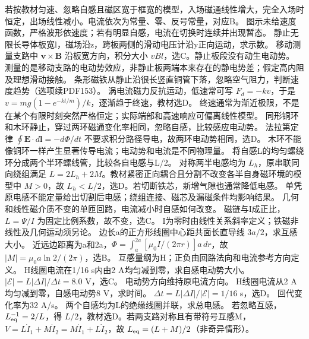 \workings 若按教材匀速、忽略自感且磁区宽于框宽的模型，入场磁通线性增大，完全入场时恒定，出场线性减小。电流依次为常量、零、反号常量，对应B。
\crosscheck 图示未给速度函数，严格波形依速度；若有明显自感，电流在切换时连续并出现暂态。
\problemtext 静止无限长导体板宽l，磁场沿z，跨板两侧的滑动电压计沿y正向运动，求示数。
\workings 移动测量支路中 $\bm v\times\bm B$ 沿板宽方向，积分大小 $vBl$，选C。静止板段没有动生电动势。
\crosscheck 测量的是移动支路的电动势效应，非静止板两端本来存在的静电势差；假定高内阻及理想滑动接触。
\problemtext 条形磁铁从静止沿很长竖直铜管下落，忽略空气阻力，判断速度趋势（选项续PDF153）。
\workings 涡电流磁力反抗运动，低速常可写 $F_d=-kv$，于是 $v=mg(1-e^{-kt/m})/k$，逐渐趋于终速，教材选D。
\crosscheck 终速通常为渐近极限，不是在某个有限时刻突然严格恒定；实际端部和高速响应可偏离线性模型。
\problemtext 同形铜环和木环静止，穿过两环磁通变化率相同，忽略自感，比较感应电动势。
\workings 法拉第定律 $\oint\bm E\cdot d\bm l=-d\Phi/dt$ 不要求积分路径导电，故两环电动势相同，选D。
\crosscheck 木环不能像铜环一样产生显著传导电流；电动势和电流是不同物理量。
\problemtext 将自感L的均匀螺绕环分成两个半环螺线管，比较各自电感与L/2。
\workings 对称两半电感均为 $L_h$，原串联同向绕组满足 $L=2L_h+2M$。教材紧密正向耦合且分割不改变各半自身磁环境的模型中 $M>0$，故 $L_h<L/2$，选D。若切断铁芯，新增气隙也通常降低电感。
\crosscheck 单凭原电感不能定量给出切割后电感；绕组连接、磁芯及漏磁条件均影响结果。
\problemtext 几何和线性磁介质不变的单匝回路，电流减小时自感如何改变。
\workings 磁链与I成正比，$L=\Psi/I$ 为固定比例系数，故不变，选C。
\crosscheck I为零时由线性关系斜率定义；铁磁非线性及几何运动须另论。
\problemtext 边长a的正方形线圈中心距共面长直导线 $3a/2$，求互感大小。
\workings 近远边距离为a和2a，$\Phi=\int_a^{2a}[\mu_0I/(2\pi r)]a\,dr$，故 $|M|=\mu_0a\ln2/(2\pi)$，选B。
\crosscheck 互感量纲为H；正负由回路法向和电流参考方向定义。
 H线圈电流在1/16 s内由2 A均匀减到零，求自感电动势大小。
\workings $|\mathcal E|=L|\Delta I|/\Delta t=8.0$ V，选C。
\crosscheck 电动势方向维持原电流方向。
 H线圈电流从2 A均匀减到零，自感电动势8 V，求时间。
\workings $\Delta t=L|\Delta I|/|\mathcal E|=1/16$ s，选D。
\crosscheck 回代变化率为32 A/s。
\problemtext 两个自感均为L的绝缘线圈并联，求总电感。
\workings 若忽略互感，$L_{\rm eq}^{-1}=2/L$，得 $L/2$，教材选D。若两支路对称且有带符号互感M，$V=L\dot I_1+M\dot I_2=M\dot I_1+L\dot I_2$，故 $L_{\rm eq}=(L+M)/2$（非奇异情形）。
